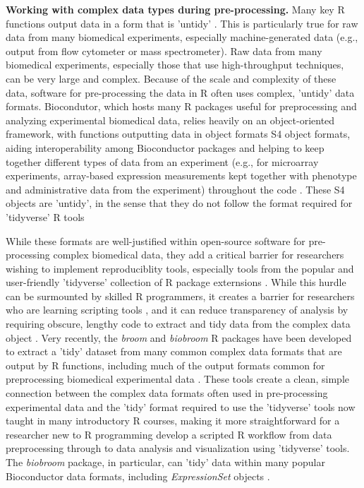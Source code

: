 \documentclass[pdftex,english,11pt,parskip=half]{scrartcl}
\begin{document}
\textbf{Working with complex data types during pre-processing.} Many key R functions output data in a form that is 'untidy' \cite{robinson2014broom}. This is particularly true for raw data from many biomedical experiments, especially machine-generated data (e.g., output from flow cytometer or mass spectrometer). Raw data from many biomedical experiments, especially those that
use high-throughput techniques, can be very large and complex. Because of the 
scale and complexity of these data, software for pre-processing the data in R
often uses complex, 'untidy' data formats. Biocondutor, which hosts many R packages useful for preprocessing and analyzing experimental biomedical data, relies heavily on an object-oriented framework, with functions outputting data in object formats S4 object formats, aiding interoperability among Bioconductor packages and helping to keep together different types of data from an experiment (e.g., for microarray experiments, array-based expression measurements kept together with phenotype and administrative data from the experiment) throughout the code \cite{gentleman2004bioconductor}. These S4 objects are 'untidy', in the sense that they do not follow the format required for 'tidyverse' R tools \cite{biobroom}

While these formats are well-justified within open-source software for pre-processing complex biomedical data, they add a critical barrier for researchers wishing
to implement reproduciblity tools, especially tools from the popular and user-friendly 'tidyverse' collection of R package externsions \cite{robinson2014broom}. While this hurdle can be surmounted by skilled R programmers, it creates a barrier for researchers who are learning scripting tools \cite{robinson2014broom}, and it can reduce transparency of analysis by requiring obscure, lengthy code to extract and tidy data from the complex data object \cite{robinson2014broom}. Very recently, the \textit{broom} and \textit{biobroom} R packages have been developed 
to extract a 'tidy' dataset from many common complex data formats that are output by R functions, including much of the output formats common for preprocessing biomedical experimental data \cite{robinson2014broom, biobroom}.
These tools create a clean, simple connection between the complex data formats
often used in pre-processing experimental data and the 'tidy' format
required to use the 'tidyverse' tools now taught in many introductory R courses, making it more straightforward for a researcher new to R programming develop a scripted R workflow from data preprocessing through to data analysis and visualization using 'tidyverse' tools. The \textit{biobroom} package, in particular, can 'tidy' data within many popular Bioconductor data formats, including \textit{ExpressionSet} objects \cite{biobroom}.
\end{document}
